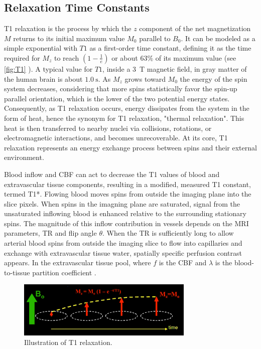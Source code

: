 \subsection{Relaxation Time Constants}

T1 relaxation is the process by which the $z$ component of the net magnetization $M$ returns to its initial maximum value $M_0$ parallel to $B_0$. It can be modeled as a simple exponential with $T1$ as a first-order time constant, defining it as the time required for $M_z$ to reach $(1 - \frac{1}{e})$ or about $63\%$ of its maximum value (see \autoref{fig:T1} \cite{T1}). A typical value for $T1$, inside a \SI{3}{\tesla} magnetic field, in gray matter of the human brain is about $\SI{1.0}{\second}$. As $M_z$ grows toward $M_0$ the energy of the spin system decreases, considering that more spins statistically favor the spin-up parallel orientation, which is the lower of the two potential energy states. Consequently, as T1 relaxation occurs, energy dissipates from the system in the form of heat, hence the synonym for T1 relaxation, "thermal relaxation". This heat is then transferred to nearby nuclei via collisions, rotations, or electromagnetic interactions, and becomes unrecoverable. At its core, T1 relaxation represents an energy exchange process between spins and their external environment.

Blood inflow and \gls{CBF} can act to decrease the T1 values of blood and extravascular tissue components, resulting in a modified, measured T1 constant, termed T1*. Flowing blood moves spins from outside the imaging plane into the slice pixels. When spins in the imagning plane are saturated, signal from the unsaturated inflowing blood is enhanced relative to the surrounding stationary spins. The magnitude of this inflow contribution in vessels depends on the \gls{MRI} parameters, \gls{TR} and \gls{flip angle} $\theta$. When the \gls{TR} is sufficiently long to allow arterial blood spins from outside the imaging slice to flow into capillaries and exchange with extravascular tissue water, spatially specific perfusion contrast appears. In the extravascular tissue pool,  where $f$ is the \gls{CBF} and $\lambda$ is the blood-to-tissue partition coefficient \cite{Detre1992}. 

\begin{figure}[htbp]
    \centering
    \includegraphics[width = 0.75\textwidth]{assets/images/T1_illustration.jpg}
    \caption{Illustration of T1 relaxation.}
    \label{fig:T1}
\end{figure}

